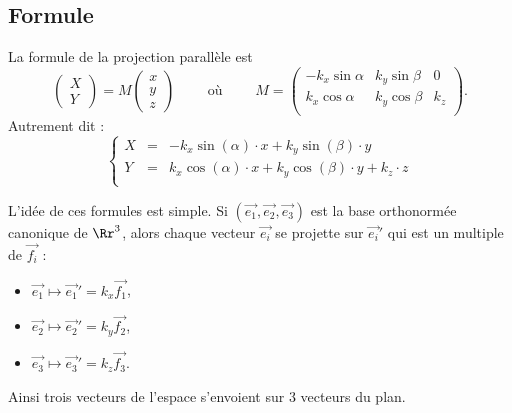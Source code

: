 \documentclass[11pt,class=report,crop=false]{standalone}
\begin{document}
 


\subsection{Formule}

\begin{proposition}
La formule de la projection parallèle est 
$$\begin{pmatrix}X\\Y\end{pmatrix} = M \begin{pmatrix}x\\y\\z\end{pmatrix}
\qquad \text{ où } \qquad 
M = \begin{pmatrix}
-k_x\sin\alpha & k_y\sin\beta & 0\\
k_x\cos\alpha  & k_y\cos\beta & k_z\\
\end{pmatrix}.
$$
Autrement dit :
$$\left\{
\begin{array}{rcl}
X &=&  -k_x\sin(\alpha) \cdot x + k_y\sin(\beta) \cdot y \\
Y &=&  k_x\cos(\alpha) \cdot x + k_y\cos(\beta) \cdot y + k_z \cdot z \\
\end{array}
\right.$$
\end{proposition}


L'idée de ces formules est simple. Si $(\vec{e_1},\vec{e_2},\vec{e_3})$ est la base orthonormée canonique de $\Rr^3$, alors chaque vecteur $\vec{e_i}$ se projette sur $\vec {e_i}'$ qui est un multiple de $\vec{f_i}$ :
\begin{itemize}
  \item $\vec {e_1} \mapsto \vec {e_1}' = k_x \vec {f_1}$,
  \item $\vec {e_2} \mapsto \vec {e_2}' = k_y \vec {f_2}$,
  \item $\vec {e_3} \mapsto \vec {e_3}' = k_z \vec {f_3}$.
\end{itemize}
Ainsi trois vecteurs de l'espace s'envoient sur $3$ vecteurs du plan.
\end{document}
